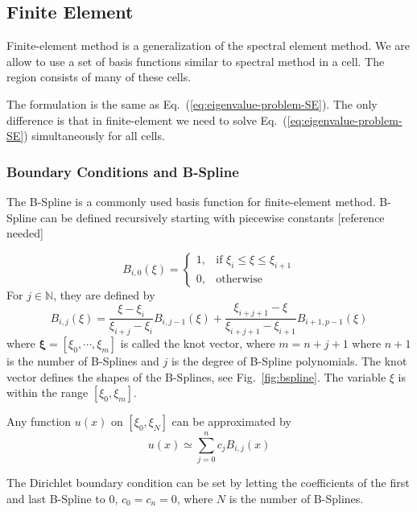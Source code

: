 \subsection{Finite Element}
Finite-element method is a generalization of the spectral element method. We are allow to use a set of basis functions similar to spectral method in a cell. The region consists of many of these cells.

The formulation is the same as Eq.~(\ref{eq:eigenvalue-problem-SE}). The only difference is that in finite-element we need to solve Eq.~(\ref{eq:eigenvalue-problem-SE}) simultaneously for all cells.

\subsubsection{Boundary Conditions and B-Spline}
The B-Spline is a commonly used basis function for finite-element method. B-Spline can be defined recursively starting with piecewise constants [reference needed]

\begin{equation}
	B_{i,0}(\xi) = \begin{cases}
		1, & \text{if } \xi_i\leq \xi \leq \xi_{i+1} \\
		0, & \text{otherwise}
	\end{cases}
\end{equation}
For $j\in\mathbb{N}$, they are defined by
\begin{equation}
	B_{i,j}(\xi) = \frac{\xi-\xi_i}{\xi_{i+j}-\xi_i}B_{i,j-1}(\xi)
	+ \frac{\xi_{i+j+1}-\xi}{\xi_{i+j+1}-\xi_{i+1}}B_{i+1,p-1}(\xi)
\end{equation}
where $\mathbf{\xi}=[\xi_0,\cdots,\xi_m]$ is called the knot vector, where $m=n+j+1$ where $n+1$ is the number of B-Splines and $j$ is the degree of B-Spline polynomials. The knot vector defines the shapes of the B-Splines, see Fig.~\ref{fig:bspline}. The variable $\xi$ is within the range $[\xi_0, \xi_m]$.

Any function $u(x)$ on $[\xi_0,\xi_N]$ can be approximated by
\[ u(x) \simeq \sum_{j=0}^{n} c_jB_{i,j}(x) \]

The Dirichlet boundary condition can be set by letting the coefficients of the first and last B-Spline to 0, $c_{0}=c_{n} = 0$, where $N$ is the number of B-Splines.

